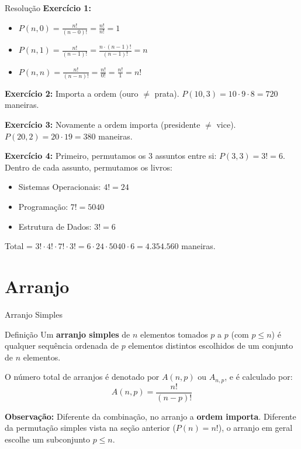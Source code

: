 \documentclass[9pt]{beamer}
\begin{document}
\begin{frame}{Resolução}
\textbf{Exercício 1:}
\begin{itemize}
    \item $P(n, 0) = \frac{n!}{(n-0)!} = \frac{n!}{n!} = 1$
    \item $P(n, 1) = \frac{n!}{(n-1)!} = \frac{n \cdot (n-1)!}{(n-1)!} = n$
    \item $P(n, n) = \frac{n!}{(n-n)!} = \frac{n!}{0!} = \frac{n!}{1} = n!$
\end{itemize}

\vspace{0.1cm}
\textbf{Exercício 2:}
Importa a ordem (ouro $\neq$ prata). $P(10, 3) = 10 \cdot 9 \cdot 8 = 720$ maneiras.

\vspace{0.1cm}
\textbf{Exercício 3:}
Novamente a ordem importa (presidente $\neq$ vice). $P(20, 2) = 20 \cdot 19 = 380$ maneiras.

\vspace{0.1cm}
\textbf{Exercício 4:}
Primeiro, permutamos os $3$ assuntos entre si: $P(3,3) = 3! = 6$.
Dentro de cada assunto, permutamos os livros:
\begin{itemize}
    \item Sistemas Operacionais: $4! = 24$
    \item Programação: $7! = 5040$
    \item Estrutura de Dados: $3! = 6$
\end{itemize}
Total = $3! \cdot 4! \cdot 7! \cdot 3! = 6 \cdot 24 \cdot 5040 \cdot 6 = 4.354.560$ maneiras.
\end{frame}

\section{Arranjo}
\begin{frame}{Arranjo Simples}

\begin{block}{Definição}
Um \textbf{arranjo simples} de $n$ elementos tomados $p$ a $p$ (com $p \leq n$) é qualquer sequência ordenada de $p$ elementos distintos escolhidos de um conjunto de $n$ elementos.
\end{block}

\vspace{0.3cm}
O número total de arranjos é denotado por $A(n,p)$ ou $A_{n,p}$, e é calculado por:
\[
A(n, p) = \frac{n!}{(n-p)!}
\]

\vspace{0.2cm}
\textbf{Observação:} Diferente da combinação, no arranjo a \textbf{ordem importa}. Diferente da permutação simples vista na seção anterior ($P(n)=n!$), o arranjo em geral escolhe um subconjunto $p \leq n$.
\end{frame}
\end{document}

